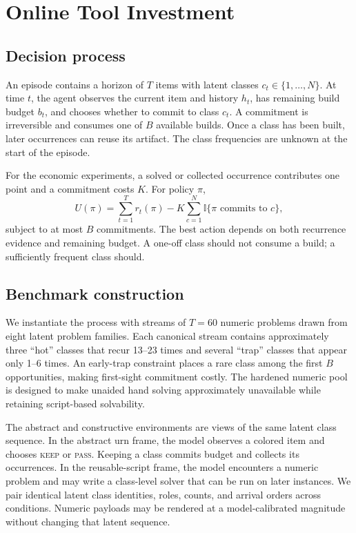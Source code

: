 \documentclass{article}
\begin{document}
\section{Online Tool Investment}

\subsection{Decision process}

An episode contains a horizon of $T$ items with latent classes
$c_t \in \{1,\ldots,N\}$. At time $t$, the agent observes the current item and
history $h_t$, has remaining build budget $b_t$, and chooses whether to commit
to class $c_t$. A commitment is irreversible and consumes one of $B$ available
builds. Once a class has been built, later occurrences can reuse its artifact.
The class frequencies are unknown at the start of the episode.

For the economic experiments, a solved or collected occurrence contributes
one point and a commitment costs $K$. For policy $\pi$,
\begin{equation}
U(\pi) =
\sum_{t=1}^{T} r_t(\pi)
- K\sum_{c=1}^{N}\mathbb{I}\{\pi\text{ commits to }c\},
\end{equation}
subject to at most $B$ commitments. The best action depends on both recurrence
evidence and remaining budget. A one-off class should not consume a build;
a sufficiently frequent class should.

\subsection{Benchmark construction}

We instantiate the process with streams of $T=60$ numeric problems drawn from
eight latent problem families. Each canonical stream contains approximately
three ``hot'' classes that recur 13--23 times and several ``trap'' classes that
appear only 1--6 times. An early-trap constraint places a rare class among the
first $B$ opportunities, making first-sight commitment costly. The hardened
numeric pool is designed to make unaided hand solving approximately unavailable
while retaining script-based solvability.

The abstract and constructive environments are views of the same latent class
sequence. In the abstract urn frame, the model observes a colored item and
chooses \textsc{keep} or \textsc{pass}. Keeping a class commits budget and
collects its occurrences. In the reusable-script frame, the model encounters a
numeric problem and may write a class-level solver that can be run on later
instances. We pair identical latent class identities, roles, counts, and arrival
orders across conditions. Numeric payloads may be rendered at a model-calibrated
magnitude without changing that latent sequence.
\end{document}

